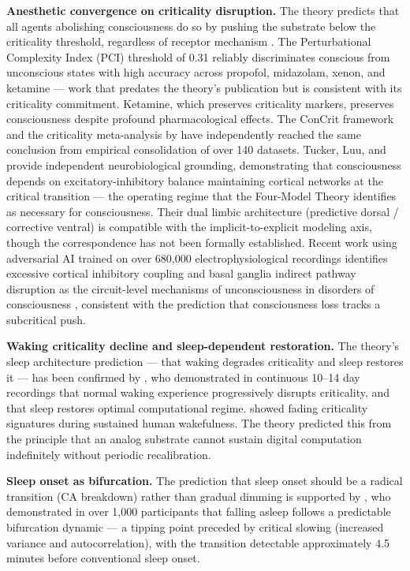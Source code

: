\documentclass[12pt]{article}
\begin{document}
\textbf{Anesthetic convergence on criticality disruption.} The theory predicts that all agents abolishing consciousness do so by pushing the substrate below the criticality threshold, regardless of receptor mechanism \citep{Gruber2015}. The Perturbational Complexity Index (PCI) threshold of 0.31 reliably discriminates conscious from unconscious states with high accuracy across propofol, midazolam, xenon, and ketamine \citep{Casali2013,Casarotto2016} --- work that predates the theory's publication but is consistent with its criticality commitment. Ketamine, which preserves criticality markers, preserves consciousness despite profound pharmacological effects. The ConCrit framework \citep{AlgomShriki2026} and the criticality meta-analysis by \citet{HengenShew2025} have independently reached the same conclusion from empirical consolidation of over 140 datasets. Tucker, Luu, and \citet{TuckerLuuFriston2025} provide independent neurobiological grounding, demonstrating that consciousness depends on excitatory-inhibitory balance maintaining cortical networks at the critical transition --- the operating regime that the Four-Model Theory identifies as necessary for consciousness. Their dual limbic architecture (predictive dorsal / corrective ventral) is compatible with the implicit-to-explicit modeling axis, though the correspondence has not been formally established. Recent work using adversarial AI trained on over 680,000 electrophysiological recordings identifies excessive cortical inhibitory coupling and basal ganglia indirect pathway disruption as the circuit-level mechanisms of unconsciousness in disorders of consciousness \citep{Toker2026}, consistent with the prediction that consciousness loss tracks a subcritical push.

\textbf{Waking criticality decline and sleep-dependent restoration.} The theory's sleep architecture prediction --- that waking degrades criticality and sleep restores it --- has been confirmed by \citet{Bhatt2024}, who demonstrated in continuous 10--14 day recordings that normal waking experience progressively disrupts criticality, and that sleep restores optimal computational regime. \citet{Meisel2013} showed fading criticality signatures during sustained human wakefulness. The theory predicted this from the principle that an analog substrate cannot sustain digital computation indefinitely without periodic recalibration.

\textbf{Sleep onset as bifurcation.} The prediction that sleep onset should be a radical transition (CA breakdown) rather than gradual dimming is supported by \citet{Li2025}, who demonstrated in over 1,000 participants that falling asleep follows a predictable bifurcation dynamic --- a tipping point preceded by critical slowing (increased variance and autocorrelation), with the transition detectable approximately 4.5 minutes before conventional sleep onset.
\end{document}
